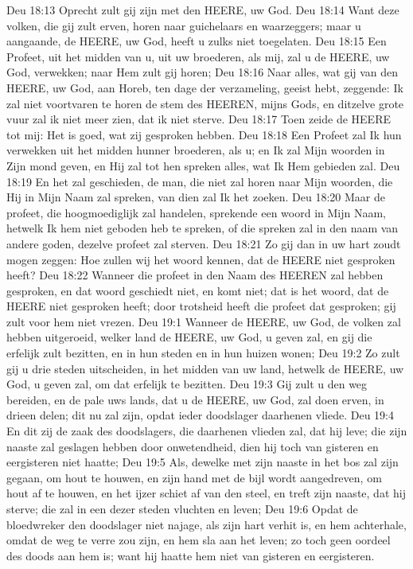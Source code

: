 Deu 18:13  Oprecht zult gij zijn met den HEERE, uw God.
Deu 18:14  Want deze volken, die gij zult erven, horen naar guichelaars en waarzeggers; maar u aangaande, de HEERE, uw God, heeft u zulks niet toegelaten.
Deu 18:15  Een Profeet, uit het midden van u, uit uw broederen, als mij, zal u de HEERE, uw God, verwekken; naar Hem zult gij horen;
Deu 18:16  Naar alles, wat gij van den HEERE, uw God, aan Horeb, ten dage der verzameling, geeist hebt, zeggende: Ik zal niet voortvaren te horen de stem des HEEREN, mijns Gods, en ditzelve grote vuur zal ik niet meer zien, dat ik niet sterve.
Deu 18:17  Toen zeide de HEERE tot mij: Het is goed, wat zij gesproken hebben.
Deu 18:18  Een Profeet zal Ik hun verwekken uit het midden hunner broederen, als u; en Ik zal Mijn woorden in Zijn mond geven, en Hij zal tot hen spreken alles, wat Ik Hem gebieden zal.
Deu 18:19  En het zal geschieden, de man, die niet zal horen naar Mijn woorden, die Hij in Mijn Naam zal spreken, van dien zal Ik het zoeken.
Deu 18:20  Maar de profeet, die hoogmoediglijk zal handelen, sprekende een woord in Mijn Naam, hetwelk Ik hem niet geboden heb te spreken, of die spreken zal in den naam van andere goden, dezelve profeet zal sterven.
Deu 18:21  Zo gij dan in uw hart zoudt mogen zeggen: Hoe zullen wij het woord kennen, dat de HEERE niet gesproken heeft?
Deu 18:22  Wanneer die profeet in den Naam des HEEREN zal hebben gesproken, en dat woord geschiedt niet, en komt niet; dat is het woord, dat de HEERE niet gesproken heeft; door trotsheid heeft die profeet dat gesproken; gij zult voor hem niet vrezen.
Deu 19:1  Wanneer de HEERE, uw God, de volken zal hebben uitgeroeid, welker land de HEERE, uw God, u geven zal, en gij die erfelijk zult bezitten, en in hun steden en in hun huizen wonen;
Deu 19:2  Zo zult gij u drie steden uitscheiden, in het midden van uw land, hetwelk de HEERE, uw God, u geven zal, om dat erfelijk te bezitten.
Deu 19:3  Gij zult u den weg bereiden, en de pale uws lands, dat u de HEERE, uw God, zal doen erven, in drieen delen; dit nu zal zijn, opdat ieder doodslager daarhenen vliede.
Deu 19:4  En dit zij de zaak des doodslagers, die daarhenen vlieden zal, dat hij leve; die zijn naaste zal geslagen hebben door onwetendheid, dien hij toch van gisteren en eergisteren niet haatte;
Deu 19:5  Als, dewelke met zijn naaste in het bos zal zijn gegaan, om hout te houwen, en zijn hand met de bijl wordt aangedreven, om hout af te houwen, en het ijzer schiet af van den steel, en treft zijn naaste, dat hij sterve; die zal in een dezer steden vluchten en leven;
Deu 19:6  Opdat de bloedwreker den doodslager niet najage, als zijn hart verhit is, en hem achterhale, omdat de weg te verre zou zijn, en hem sla aan het leven; zo toch geen oordeel des doods aan hem is; want hij haatte hem niet van gisteren en eergisteren.

